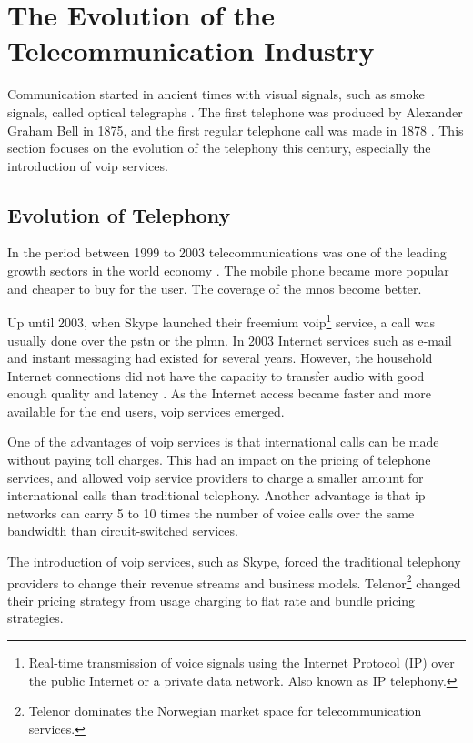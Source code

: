 \section{The Evolution of the Telecommunication Industry}
Communication started in ancient times with visual signals, such as smoke signals, called optical telegraphs \cite{itu50years}. The first telephone was produced by Alexander Graham Bell in 1875, and the first regular telephone call was made in 1878 \cite{hallock2004brief}. This section focuses on the evolution of the telephony this century, especially the introduction of \gls{voip} services. 


\subsection{Evolution of Telephony}
In the period between 1999 to 2003 telecommunications was one of the leading growth sectors in the world economy \cite{itu50years}. The mobile phone became more popular and cheaper to buy for the user. The coverage of the \glspl{mno} become better.

Up until 2003, when Skype launched their freemium \gls{voip}\footnote{Real-time transmission of voice signals using 
the Internet Protocol (IP) over the public Internet or a private data network. Also known as IP telephony.} service, a call was usually done over the \gls{pstn} or the \gls{plmn}. In 2003 Internet services such as e-mail and instant messaging had existed for several years. However, the household Internet connections did not have the capacity to transfer audio with good enough quality and latency \cite{thomasbruun}. As the Internet access became faster and more available for the end users, \gls{voip} services emerged. 

One of the advantages of \gls{voip} services is that international calls can be made without paying toll charges. This had an impact on the pricing of telephone services, and allowed \gls{voip} service providers to charge a smaller amount for international calls than traditional telephony. Another advantage is that \gls{ip} networks can carry 5 to 10 times the number of voice calls over the same bandwidth than circuit-switched services. 

The introduction of \gls{voip} services, such as Skype, forced the traditional telephony providers to change their revenue streams and business models. Telenor\footnote{Telenor dominates the Norwegian market space for telecommunication services.} changed their pricing strategy from usage charging to flat rate and bundle pricing strategies. 


